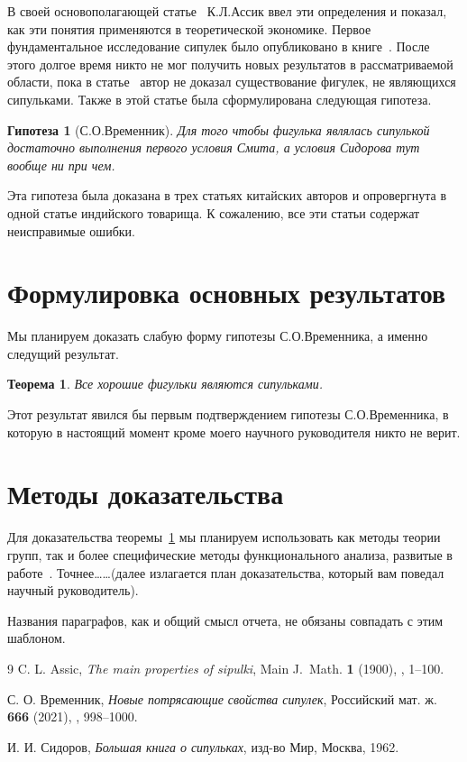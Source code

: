 \documentclass[12pt]{amsart}
\let\no\textnumero
\newtheorem{theorem}{Теорема}
\newtheorem{conj}{Гипотеза}
\theoremstyle{definition}
\begin{document}
В своей основополагающей статье~\cite{OLD} К.Л.Ассик ввел эти определения и показал, как эти понятия применяются в
теоретической экономике. Первое фундаментальное исследование сипулек было опубликовано в книге~\cite{EXTRA}. 
После этого долгое время никто не мог получить новых результатов в рассматриваемой области, пока в
статье~\cite{NEW} автор не доказал существование фигулек, не являющихся сипульками.
Также в этой статье была сформулирована следующая гипотеза.

\begin{conj}[С.О.Временник]
Для того чтобы фигулька являлась сипулькой достаточно выполнения первого условия Смита, 
а условия Сидорова тут вообще ни при чем.
\end{conj}

Эта гипотеза была доказана в трех статьях китайских авторов и опровергнута в одной статье индийского товарища.
К сожалению, все эти статьи содержат неисправимые ошибки. 

\section{Формулировка основных результатов}
Мы планируем доказать слабую форму гипотезы С.О.Временника, а именно следущий результат.

\begin{theorem}\label{main}
Все хорошие фигульки являются сипульками.
\end{theorem}

Этот результат явился бы первым подтверждением гипотезы С.О.Временника, в которую в настоящий момент кроме
моего научного руководителя никто не верит.

\section{Методы доказательства}
Для доказательства теоремы~\ref{main} мы планируем использовать как методы теории групп, так и более специфические методы
функционального анализа, развитые в работе~\cite{NEW}. Точнее\dots\dots (далее излагается план доказательства, который вам
поведал научный руководитель).

\bigskip\bigskip
Названия параграфов, как и общий смысл отчета, не обязаны совпадать с этим шаблоном.

\begin{thebibliography}{9}%
C. L. Assic, \emph{The main properties of sipulki}, Main J.~Math. \textbf{1} (1900), \no 1, 1--100.

С. О. Временник, \emph{Новые потрясающие свойства сипулек},
  Российский мат. ж. \textbf{666} (2021), \no 1, 998--1000.

И. И. Сидоров, \emph{Большая книга о сипульках}, изд-во Мир, Москва, 1962.
\end{thebibliography}
\end{document}
